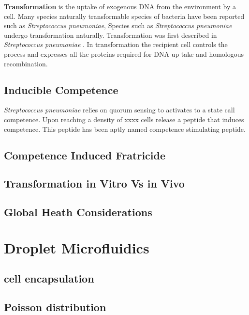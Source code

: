 \textbf{Transformation} is the uptake of exogenous DNA from the environment by a cell\cite{Johnston2014}.
Many species naturally transformable species of bacteria have been reported such as \textit{Streptococcus pneumoniae},  
Species such as \textit{Streptococcus pneumoniae} undergo transformation naturally.
Transformation was first described in \textit{Streptococcus pneumoniae} \cite{Griffith1928}.
In transformation the recipient cell controls the process and expresses all the proteins required for DNA up-take and homologous recombination.

\subsection{Inducible Competence}

\textit{Streptococcus pneumoniae} relies on quorum sensing to activates to a state call competence.
Upon reaching a density of xxxx cells release a peptide that induces competence.
This peptide has been aptly named competence stimulating peptide.

\subsection{Competence Induced Fratricide}
 
\subsection{Transformation in Vitro Vs in Vivo}

\subsection{Global Heath Considerations}

\section{Droplet Microfluidics}

\subsection{cell encapsulation}

\subsection{Poisson distribution}





